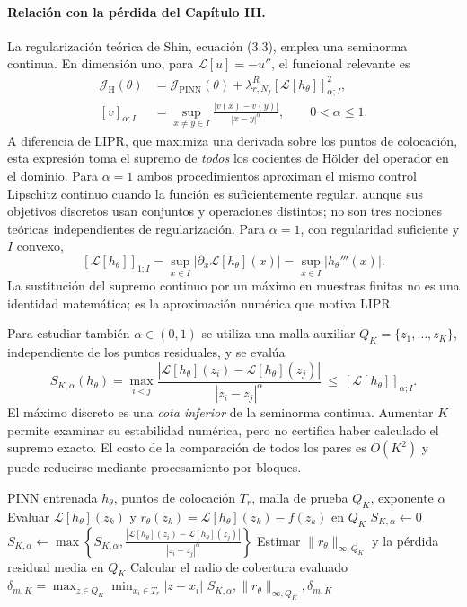 \paragraph{Relación con la pérdida del Capítulo III.}
La regularización teórica de Shin, ecuación (3.3), emplea una seminorma continua. En dimensión uno, para $\mathcal L[u]=-u''$, el funcional relevante es
\begin{align*}
\mathcal J_{\mathrm{H}}(\theta)
&=\mathcal J_{\mathrm{PINN}}(\theta)
+\lambda_{r,N_f}^{R}[\mathcal L[h_\theta]]_{\alpha;I}^{2},\\
[v]_{\alpha;I}
&=\sup_{x\neq y\in I}\frac{|v(x)-v(y)|}{|x-y|^{\alpha}},\qquad 0<\alpha\leq1.
\end{align*}
A diferencia de LIPR, que maximiza una derivada sobre los puntos de colocación, esta expresión toma el supremo de \emph{todos} los cocientes de H\"older del operador en el dominio. Para $\alpha=1$ ambos procedimientos aproximan el mismo control Lipschitz continuo cuando la función es suficientemente regular, aunque sus objetivos discretos usan conjuntos y operaciones distintos; no son tres nociones teóricas independientes de regularización. Para $\alpha=1$, con regularidad suficiente y $I$ convexo,
\[
[\mathcal L[h_\theta]]_{1;I}
=\sup_{x\in I}|\partial_x\mathcal L[h_\theta](x)|
=\sup_{x\in I}|h_\theta'''(x)|.
\]
La sustitución del supremo continuo por un máximo en muestras finitas no es una identidad matemática; es la aproximación numérica que motiva LIPR.

Para estudiar también $\alpha\in(0,1)$ se utiliza una malla auxiliar $Q_K=\{z_1,\dots,z_K\}$, independiente de los puntos residuales, y se evalúa
\[
S_{K,\alpha}(h_\theta)
=\max_{i<j}\frac{|\mathcal L[h_\theta](z_i)-\mathcal L[h_\theta](z_j)|}
{|z_i-z_j|^\alpha}
\ \leq\ [\mathcal L[h_\theta]]_{\alpha;I}.
\]
El máximo discreto es una \emph{cota inferior} de la seminorma continua. Aumentar $K$ permite examinar su estabilidad numérica, pero no certifica haber calculado el supremo exacto. El costo de la comparación de todos los pares es $O(K^2)$ y puede reducirse mediante procesamiento por bloques.

\begin{algorithm}
\caption{Aproximación discreta del control H\"older y evaluación del residuo}
\label{alg:holder_diagnostico}
\begin{algorithmic}[1]
\Require PINN entrenada $h_\theta$, puntos de colocación $T_r$, malla de prueba $Q_K$, exponente $\alpha$
\State Evaluar $\mathcal L[h_\theta](z_k)$ y $r_\theta(z_k)=\mathcal L[h_\theta](z_k)-f(z_k)$ en $Q_K$
\State $S_{K,\alpha}\gets0$
        \State $S_{K,\alpha}\gets\max\!\left\{S_{K,\alpha},\frac{|\mathcal L[h_\theta](z_i)-\mathcal L[h_\theta](z_j)|}{|z_i-z_j|^\alpha}\right\}$
    \EndFor
\EndFor
\State Estimar $\|r_\theta\|_{\infty,Q_K}$ y la pérdida residual media en $Q_K$
\State Calcular el radio de cobertura evaluado $\delta_{m,K}=\max_{z\in Q_K}\min_{x_i\in T_r}|z-x_i|$
\State \Return $S_{K,\alpha},\|r_\theta\|_{\infty,Q_K},\delta_{m,K}$
\end{algorithmic}
\end{algorithm}

